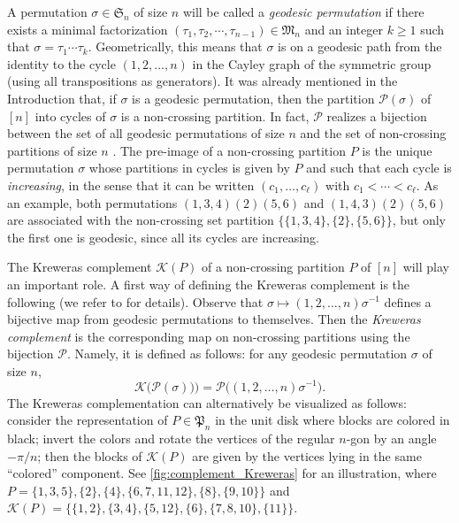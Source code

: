 \documentclass[10pt]{amsart}
\theoremstyle{definition}\newtheorem{defi}[theo]{Definition}\newtheorem{rema}[theo]{Remark}\newtheorem{exam}[theo]{Example}\newtheorem{exem}[theo]{Example}\newtheorem{nota}[theo]{Notation}
\def\PPP{\mathcal P}
\begin{document}
A permutation $\sigma \in \mathfrak{S}_{n}$ of size $n$ will be called a {\em geodesic permutation} if
there exists a minimal factorization $(\tau_1,\tau_2,\cdots,\tau_{n-1}) \in \mathfrak{M}_{n}$
and an integer $k \ge 1$ such that $\sigma=\tau_1 \cdots \tau_k$.
Geometrically, this means that $\sigma$ is on a geodesic path from the identity to the cycle
$(1,2,\ldots,n)$ in the Cayley graph of the symmetric group (using all transpositions as generators).
It was already mentioned in the Introduction that, if $\sigma$ is a geodesic permutation,
then the partition $\PPP(\sigma)$ of $[n]$ into cycles of $\sigma$ is a non-crossing partition.
In fact, $\PPP$ realizes a bijection between the set of all  geodesic permutations of size $n$
and the set of non-crossing partitions of size $n$ \cite[Theorem 1]{Biane1997}.
The pre-image of a non-crossing partition $P$ is the unique permutation $\sigma$
whose partitions in cycles is given by $P$ and such that each cycle is {\em increasing},
in the sense that it can be written
$(c_1,\ldots,c_\ell)$ with $c_1<\cdots<c_\ell$.
As an example, both permutations $(1,3,4)(2)(5,6)$ and $(1,4,3)(2)(5,6)$ are associated
with the non-crossing set partition $\{\{1,3,4\},\{2\},\{5,6\}\}$,
but only the first one is geodesic, since all its cycles are increasing.


The Kreweras complement $ \mathcal{K}(P)$ of a non-crossing partition $P$ of $[n]$ will play an important role.
A first way of defining the Kreweras complement is the following (we refer to \cite[Sec.~9 and Sec.~18]{NS06} for details).
Observe that $\sigma \mapsto   (1,2, \ldots,n) \sigma^{-1} $
defines a bijective map from geodesic permutations to themselves.
Then the \emph{Kreweras complement} is the corresponding map on non-crossing partitions
using the bijection $\PPP$.
Namely, it is defined as follows: for any geodesic permutation $\sigma$ of size $n$,
\begin{equation}
\label{eq:K}\mathcal{K}\big(\PPP(\sigma)) \big)= \PPP \big( (1,2, \ldots,n) \sigma^{-1} \big).
\end{equation}
 The Kreweras complementation can alternatively be visualized as follows: consider the representation of $P \in \mathfrak{P}_n$ in the unit disk where blocks are colored in black; invert the colors and rotate the vertices of the regular $n$-gon by an angle $-\pi/n$; then the blocks of $ \mathcal{K}(P)$ are given by the vertices lying in the same ``colored'' component. See \cref{fig:complement_Kreweras} for an illustration,
 where $P=
\{1, 3, 5\}, \{2\}, \{4\}, \{6, 7, 11, 12\}, \{8\}, \{9, 10\}\}$
and $\mathcal{K}(P)=\{\{1, 2\}, \{3, 4\}, \{5, 12\}, \{6\}, \{7, 8, 10\}, \{11\}\}$.
\end{document}
